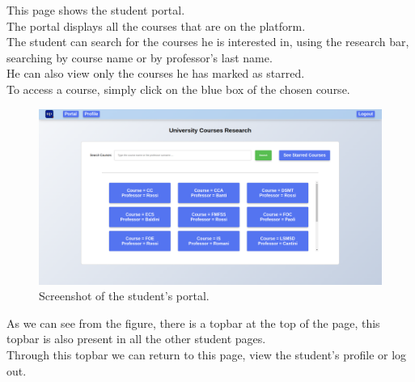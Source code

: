 This page shows the student portal.\\

The portal displays all the courses that are on the platform.\\
The student can search for the courses he is interested in, using the research bar, searching by course name or by professor's last name.\\
He can also view only the courses he has marked as starred.\\
To access a course, simply click on the blue box of the chosen course.\\

\begin{figure}[H]
    \centering
     \includegraphics[width=1\textwidth]{img/user_manual/student/student-portal.png}
    \caption{\label{fig:student-portal} Screenshot of the student's portal.}
\end{figure}

As we can see from the figure, there is a topbar at the top of the page, this topbar is also present in all the other student pages.\\
Through this topbar we can return to this page, view the student's profile or log out.